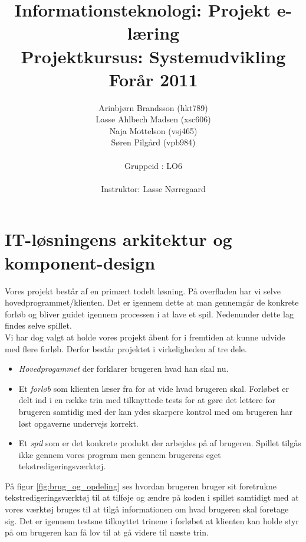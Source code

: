 \documentclass[10pt,a4paper,danish]{article}
\title{Informationsteknologi: Projekt e-læring \\ Projektkursus: Systemudvikling \\Forår 2011}
\author{Arinbjørn Brandsson (hkt789)\\Lasse Ahlbech Madsen (xsc606)\\Naja Mottelson (vsj465)\\Søren Pilgård (vpb984)\\
\\
Gruppeid : LO6\\
\\Instruktor: Lasse Nørregaard}
\begin{document}
\maketitle
\newpage

\tableofcontents
\newpage

\section{IT-løsningens arkitektur og komponent-design}
Vores projekt består af en primært todelt løsning.
På overfladen har vi selve hovedprogrammet/klienten. Det er igennem dette at man gennemgår de konkrete forløb og bliver guidet igennem processen i at lave et spil. Nedenunder dette lag findes selve spillet.
\\

Vi har dog valgt at holde vores projekt åbent for i fremtiden at kunne udvide med flere forløb. Derfor består projektet i virkeligheden af tre dele.
\begin{itemize}
\item \textit{Hovedprogammet} der forklarer brugeren hvad han skal nu.
\item Et \textit{forløb} som klienten læser fra for at vide hvad brugeren skal. Forløbet er delt ind i en række trin med tilknyttede tests for at gøre det lettere for brugeren samtidig med der kan ydes skarpere kontrol med om brugeren har løst opgaverne undervejs korrekt.
\item Et \textit{spil} som er det konkrete produkt der arbejdes på af brugeren.
Spillet tilgås ikke gennem vores program men gennem brugerens eget tekstredigeringsværktøj.
\end{itemize}
På figur \ref{fig:brug_og_opdeling} ses hvordan brugeren bruger sit foretrukne tekstredigeringsværktøj til at tilføje og ændre på koden i spillet samtidigt med at vores værktøj bruges til at tilgå informationen om hvad brugeren skal foretage sig. Det er igennem testsne tilknyttet trinene i forløbet at klienten kan holde styr på om brugeren kan få lov til at gå videre til næste trin.
\end{document}
